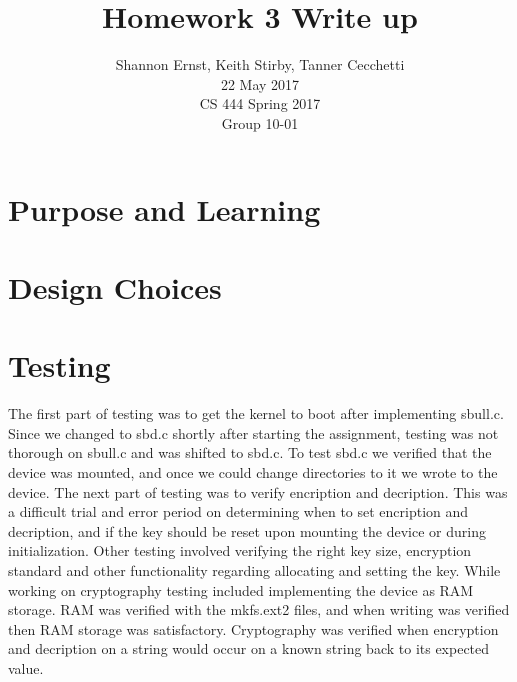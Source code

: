 \documentclass[letterpaper,10pt,serif,draftclsnofoot,onecolumn,compsoc,titlepage]{IEEEtran}
\title{Homework 3 Write up}
\author{Shannon Ernst, Keith Stirby, Tanner Cecchetti\\ 22 May 2017 \\ CS 444 Spring 2017 \\ Group 10-01}
\begin{document}
\maketitle
\begin{abstract}

\end{abstract}
\newpage
\tableofcontents
\newpage
\section{Purpose and Learning}

\section{Design Choices}

\section{Testing}
The first part of testing was to get the kernel to boot after implementing sbull.c. Since we changed to sbd.c shortly after starting the assignment, testing was not thorough on sbull.c and was shifted to sbd.c. To test sbd.c we verified that the device was mounted, and once we could change directories to it we wrote to the device. The next part of testing was to verify encription and decription. This was a difficult trial and error period on determining when to set encription and decription, and if the key should be reset upon mounting the device or during initialization. Other testing involved verifying the right key size, encryption standard and other functionality regarding allocating and setting the key. While working on cryptography testing included implementing the device as RAM storage. RAM was verified with the mkfs.ext2 files, and when writing was verified then RAM storage was satisfactory. Cryptography was verified when encryption and decription on a string would occur on a known string back to its expected value. 
\end{document}
